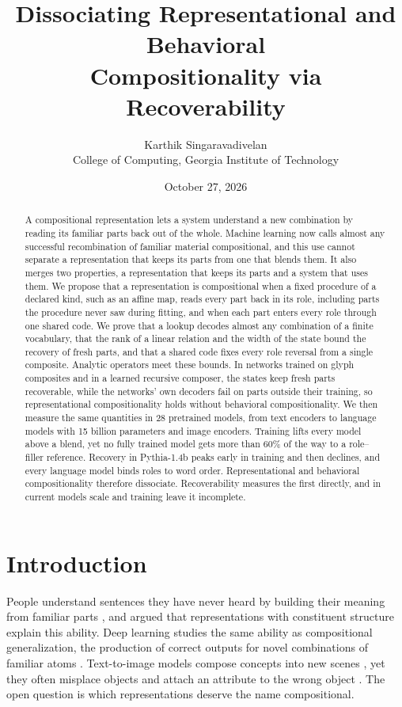 \documentclass[10pt]{article}
\title{Dissociating Representational and Behavioral\\ Compositionality via Recoverability}
\author{Karthik Singaravadivelan\\ College of Computing, Georgia Institute of Technology}
\date{October 27, 2026}
\theoremstyle{plain}
\theoremstyle{remark}
\begin{document}
\maketitle

\begin{abstract}
A compositional representation lets a system understand a new combination by reading its familiar parts back out of the whole. Machine learning now calls almost any successful recombination of familiar material compositional, and this use cannot separate a representation that keeps its parts from one that blends them. It also merges two properties, a representation that keeps its parts and a system that uses them. We propose that a representation is compositional when a fixed procedure of a declared kind, such as an affine map, reads every part back in its role, including parts the procedure never saw during fitting, and when each part enters every role through one shared code. We prove that a lookup decodes almost any combination of a finite vocabulary, that the rank of a linear relation and the width of the state bound the recovery of fresh parts, and that a shared code fixes every role reversal from a single composite. Analytic operators meet these bounds. In networks trained on glyph composites and in a learned recursive composer, the states keep fresh parts recoverable, while the networks' own decoders fail on parts outside their training, so representational compositionality holds without behavioral compositionality. We then measure the same quantities in 28 pretrained models, from text encoders to language models with 15 billion parameters and image encoders. Training lifts every model above a blend, yet no fully trained model gets more than 60\% of the way to a role--filler reference. Recovery in Pythia-1.4b peaks early in training and then declines, and every language model binds roles to word order. Representational and behavioral compositionality therefore dissociate. Recoverability measures the first directly, and in current models scale and training leave it incomplete.
\end{abstract}

\section{Introduction}
\label{sec:intro}

People understand sentences they have never heard by building their meaning from familiar parts \citep{frege1923}, and \citet{fodor1988} argued that representations with constituent structure explain this ability. Deep learning studies the same ability as compositional generalization, the production of correct outputs for novel combinations of familiar atoms \citep{lake2018,keysers2020,kim2020cogs}. Text-to-image models compose concepts into new scenes \citep{ramesh2021,okawa2023}, yet they often misplace objects \citep{conwell2022} and attach an attribute to the wrong object \citep{rassin2022}. The open question is which representations deserve the name compositional.
\end{document}
